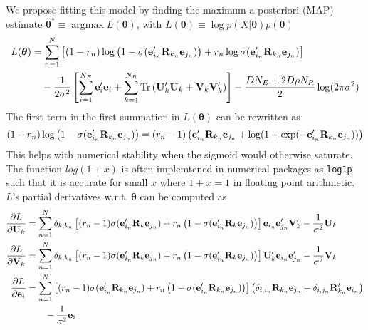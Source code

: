 \documentclass[a4paper, 11pt, fleqn]{article}
\newcommand{\btheta}[0]{\boldsymbol{\theta}}
\begin{document}
We propose fitting this model by finding the maximum a posteriori
(MAP) estimate $\btheta^* \equiv
\operatorname{argmax} L(\btheta)$,  with $L(\btheta)
\equiv \log p(X\vert \btheta)p(\btheta)$
\begin{align}
  \label{eqn:loglike}
  L(\btheta) &= \sum_{n=1}^{N}\left[ (1 - r_n) \log \left(1 -
    \sigma({\bf e}'_{i_n}{\bf R}_{k_n}{\bf e}_{j_n})\right) + r_n \log
  \sigma({\bf e}'_{i_n}{\bf R}_{k_n}{\bf e}_{j_n})\right] \nonumber \\
  &\quad - \frac{1}{2\sigma^2}\left[ \sum_{i=1}^{N_E} {\bf e}_i'{\bf e}_i
  +\sum_{k=1}^{N_R}
  \text{Tr}\left({\bf U}_k'{\bf U}_k + {\bf V}_k{\bf V}_k'\right)\right]
  - \frac{DN_E + 2D\rho N_R}{2}\log(2\pi\sigma^2)
\end{align}
The first term in the first summation in $L(\btheta)$ can be rewritten as
\begin{align}
(1 - r_n) \log \left(1 -
    \sigma({\bf e}'_{i_n}{\bf R}_{k_n}{\bf e}_{j_n})\right) =
  (r_n - 1)\left( {\bf e}'_{i_n}{\bf R}_{k_n}{\bf e}_{j_n} +
  \log(1 + \exp(-{\bf e}'_{i_n}{\bf R}_{k_n}{\bf e}_{j_n})) \right)
\end{align}
This helps with numerical stability when the sigmoid would otherwise
saturate. The function $log(1 + x)$ is often implemtened in numerical
packages as \texttt{log1p} such that it is accurate for small $x$
where $1 + x = 1$ in floating point arithmetic. $L$'s partial
derivatives w.r.t. $\btheta$ can be computed as
\begin{align}
  \label{eqn:objective}
  \frac{\partial L}{\partial {\bf U}_k} &=
  \sum_{n=1}^{N}\delta_{k,k_n}\left[(r_n - 1)\sigma({\bf
      e}'_{i_n}{\bf R}_{k}{\bf e}_{j_n}) + r_n \left( 1 - \sigma({\bf
        e}'_{i_n}{\bf R}_{k}{\bf e}_{j_n}) \right)\right]
  {\bf e}_{i_n}{\bf e}'_{j_n}{\bf V}'_k- \frac{1}{\sigma^{2}}{\bf U}_k \\
  \frac{\partial L}{\partial {\bf V}_k} &=
  \sum_{n=1}^{N}\delta_{k,k_n}\left[(r_n - 1)\sigma({\bf
      e}'_{i_n}{\bf R}_{k}{\bf e}_{j_n}) + r_n \left( 1 - \sigma({\bf
        e}'_{i_n}{\bf R}_{k}{\bf e}_{j_n}) \right)\right]
  {\bf U}'_k{\bf e}_{i_n}{\bf e}'_{j_n} - \frac{1}{\sigma^{2}}{\bf V}_k \\
  \frac{\partial L}{\partial {\bf e}_i} &=
  \sum_{n=1}^{N}\left[(r_n - 1)\sigma({\bf
      e}'_{i_n}{\bf R}_{k_n}{\bf e}_{j_n}) + r_n \left( 1 - \sigma({\bf
        e}'_{i_n}{\bf R}_{k_n}{\bf e}_{j_n}) \right)\right] \left( \delta_{i,i_n}{\bf R}_{k_n}
    {\bf e}_{j_n} + \delta_{i,j_n}{\bf R}'_{k_n} {\bf
      e}_{i_n}\right)\nonumber \\
  &\qquad - \frac{1}{\sigma^2} {\bf e}_i
\end{align}
\end{document}
